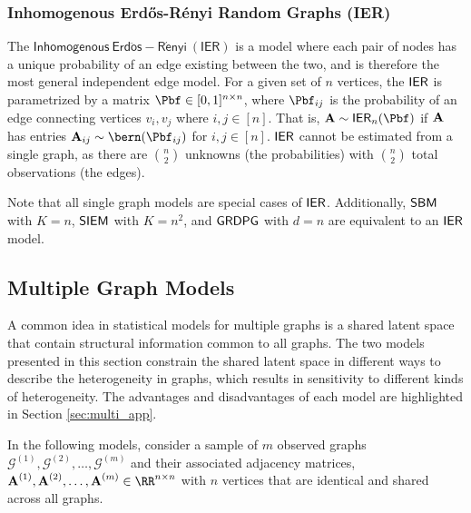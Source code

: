 \subsubsection{Inhomogenous Erd\H os-R\'enyi Random Graphs (IER)}\label{sec:uierrg}
The $\mathsf{Inhomogenous~Erd\ddot{o}s-R\acute{e}nyi~(IER)}$ is a model where each pair of nodes has a unique probability of an edge existing between the two, and is therefore the most general independent edge model. For a given set of $n$ vertices, the $\operatorname{\mathsf{IER}}$ is parametrized by a matrix $\Pbf \in [0, 1]^{n \times n}$, where $\Pbf_{ij}$ is the probability of an edge connecting vertices $v_i, v_j$ where $i, j \in [n]$. That is, $\A \sim \ier_n(\Pbf)$ if $\operatorname{\mathbf{A}}$ has entries $\A_{ij}\sim \bern(\Pbf_{ij})$ for $i, j \in [n]$. $\operatorname{\mathsf{IER}}$ cannot be estimated from a single graph, as there are $n\choose 2$ unknowns (the probabilities) with $n\choose 2$ total observations (the edges).


Note that all single graph models are special cases of $\operatorname{\mathsf{IER}}$. Additionally, $\operatorname{\mathsf{SBM}}$ with $K=n$, $\operatorname{\mathsf{SIEM}}$ with $K=n^2$, and $\operatorname{\mathsf{GRDPG}}$ with $d=n$ are equivalent to an $\operatorname{\mathsf{IER}}$ model.

\subsection{Multiple Graph Models}\label{sec:multi_graph_models}

A common idea in statistical models for multiple graphs is a shared latent space that contain structural information common to all graphs. The two models presented in this section constrain the shared latent space in different ways to describe the heterogeneity in graphs, which results in sensitivity to different kinds of heterogeneity. The advantages and disadvantages of each model are highlighted in Section \ref{sec:multi_app}.

In the following models, consider a sample of $m$ observed graphs $\mathcal{G}^{(1)}, \mathcal{G}^{(2)}, \ldots, \mathcal{G}^{(m)}$  and their associated adjacency matrices, $\A^{(1)}, \A^{(2)}, \ldots, \A^{(m)}\in\RR^{n\times n}$ with $n$ vertices that are identical and shared across all graphs. 

